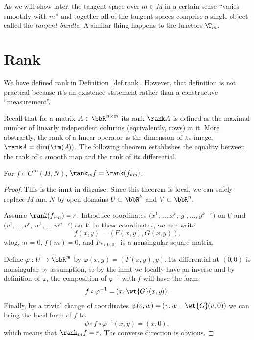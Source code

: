 As we will show later, the tangent space over $m\in M$ in a certain sense ``varies smoothly with $m$'' and together all of the tangent spaces comprise a single object called the \emph{tangent bundle}. A similar thing happens to the functors $\T_m$.

\section{Rank}
We have defined rank in Definition~\ref{def.rank}. However, that definition is not practical because it's an existence statement rather than a constructive ``measurement''.

Recall that for a matrix $A\in \bbR^{n\times m}$ its rank $\rank A$ is defined as the maximal number of linearly independent columns (equivalently, rows) in it. More abstractly, the rank of a linear operator is the dimension of its image, $\rank A=\dim(\im (A))$. The following theorem establishes the equality between the rank of a smooth map and the rank of its differential.

\begin{thm}\label{Rank thm}
    For $f\in C^\infty(M,N)$, $\rank_m f=\rank (f_{\ast m})$.
\end{thm}
\begin{proof}
    This is the \gls{inmt} in disguise. Since this theorem is local, we can safely replace $M$ and $N$ by open domains $U\subset \bbR^k$ and $V\subset \bbR^n.$

    Assume $\rank(f_{\ast m})=r$. Introduce coordinates $(x^1,\ldots,x^r$, $y^1,\ldots,y^{k-r})$ on $U$ and $(v^1,\ldots,v^r$, $w^1,\ldots,w^{n-r})$ on $V$. In these coordinates, we can write \[f(x,y)=(F(x,y),G(x,y)).\] \Gls{wlog}, $m=0$, $f(m)=0$, and  $F_{\ast (0,0)}$ is a nonsingular square matrix.

    Define $\varphi:U\to\bbR^m$ by $\varphi(x,y)=(F(x,y),y)$. Its differential at $(0,0)$ is nonsingular by assumption, so by the \gls{inmt} we locally have an inverse and by definition of $\varphi$, the composition of $\varphi^{-1}$ with $f$ will have the form 
    \[
    f\circ\varphi^{-1}=(x,\wt{G}(x,y)).
    \]
    Finally, by a trivial change of coordinates $\psi(v,w)=(v,w-\wt{G}(v,0))$ we can bring the local form of $f$ to \[\psi\circ f\circ \varphi^{-1}(x,y)=(x,0),\] which means that $\rank_m f=r$. The converse direction is obvious.
\end{proof}

